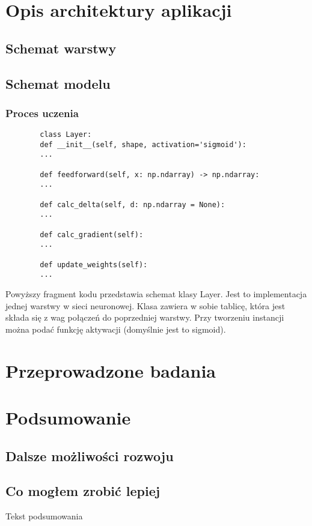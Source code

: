 \documentclass{report}
\begin{document}
    \chapter{Opis architektury aplikacji}

    \section{Schemat warstwy}

    \section{Schemat modelu}

    \subsection{Proces uczenia}

    \begin{lstlisting}
        class Layer:
        def __init__(self, shape, activation='sigmoid'):
        ...

        def feedforward(self, x: np.ndarray) -> np.ndarray:
        ...

        def calc_delta(self, d: np.ndarray = None):
        ...

        def calc_gradient(self):
        ...

        def update_weights(self):
        ...
    \end{lstlisting}
    \label{Schemat klasy Layer}


    Powyższy fragment kodu przedstawia schemat klasy Layer.
    Jest to implementacja jednej warstwy w sieci neuronowej.
    Klasa zawiera w sobie tablicę, która jest składa się z wag połączeń do poprzedniej warstwy.
    Przy tworzeniu instancji można podać funkcję aktywacji (domyślnie jest to sigmoid).

    \chapter{Przeprowadzone badania}

    \chapter{Podsumowanie}

    \section{Dalsze możliwości rozwoju}

    \section{Co mogłem zrobić lepiej}

    Tekst podsumowania

    
    

    \listoffigures
    \listoftables
\end{document}
